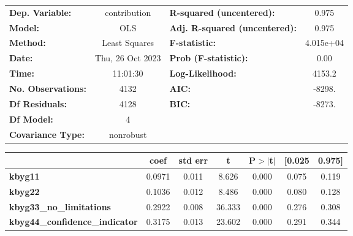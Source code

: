 \begin{center}
\begin{tabular}{lclc}
\toprule
\textbf{Dep. Variable:}                &   contribution   & \textbf{  R-squared (uncentered):}      &     0.975   \\
\textbf{Model:}                        &       OLS        & \textbf{  Adj. R-squared (uncentered):} &     0.975   \\
\textbf{Method:}                       &  Least Squares   & \textbf{  F-statistic:       }          & 4.015e+04   \\
\textbf{Date:}                         & Thu, 26 Oct 2023 & \textbf{  Prob (F-statistic):}          &     0.00    \\
\textbf{Time:}                         &     11:01:30     & \textbf{  Log-Likelihood:    }          &    4153.2   \\
\textbf{No. Observations:}             &        4132      & \textbf{  AIC:               }          &    -8298.   \\
\textbf{Df Residuals:}                 &        4128      & \textbf{  BIC:               }          &    -8273.   \\
\textbf{Df Model:}                     &           4      & \textbf{                     }          &             \\
\textbf{Covariance Type:}              &    nonrobust     & \textbf{                     }          &             \\
\bottomrule
\end{tabular}
\begin{tabular}{lcccccc}
                                       & \textbf{coef} & \textbf{std err} & \textbf{t} & \textbf{P$> |$t$|$} & \textbf{[0.025} & \textbf{0.975]}  \\
\midrule
\textbf{kbyg11}                        &       0.0971  &        0.011     &     8.626  &         0.000        &        0.075    &        0.119     \\
\textbf{kbyg22}                        &       0.1036  &        0.012     &     8.486  &         0.000        &        0.080    &        0.128     \\
\textbf{kbyg33\_no\_limitations}       &       0.2922  &        0.008     &    36.333  &         0.000        &        0.276    &        0.308     \\
\textbf{kbyg44\_confidence\_indicator} &       0.3175  &        0.013     &    23.602  &         0.000        &        0.291    &        0.344     \\

\end{tabular}
\end{center}
